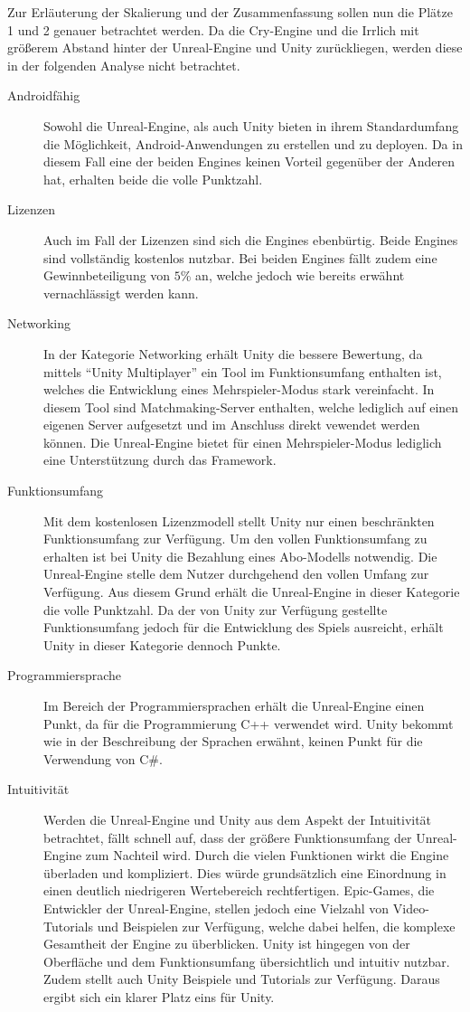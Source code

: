	Zur Erläuterung der Skalierung und der Zusammenfassung sollen nun die Plätze 1 und 2 genauer betrachtet werden.
	Da die Cry-Engine und die Irrlich mit größerem Abstand hinter der Unreal-Engine und Unity zurückliegen, werden diese in der folgenden Analyse nicht betrachtet.
	\begin{description}
		\item[Androidfähig]{Sowohl die Unreal-Engine, als auch Unity bieten in ihrem Standardumfang die Möglichkeit, Android-Anwendungen zu erstellen und zu deployen. Da in diesem Fall eine der beiden Engines keinen Vorteil gegenüber der Anderen hat, erhalten beide die volle Punktzahl.}
		\item[Lizenzen]{Auch im Fall der Lizenzen sind sich die Engines ebenbürtig. Beide Engines sind vollständig kostenlos nutzbar. Bei beiden Engines fällt zudem eine Gewinnbeteiligung von $5$\% an, welche jedoch wie bereits erwähnt vernachlässigt werden kann.}
		\item[Networking]{In der Kategorie Networking erhält Unity die bessere Bewertung, da mittels \enquote{Unity Multiplayer} ein Tool im Funktionsumfang enthalten ist, welches die Entwicklung eines Mehrspieler-Modus stark vereinfacht. In diesem Tool sind Matchmaking-Server enthalten, welche lediglich auf einen eigenen Server aufgesetzt und im Anschluss direkt vewendet werden können. Die Unreal-Engine bietet für einen Mehrspieler-Modus lediglich eine Unterstützung durch das Framework.}
		\item[Funktionsumfang]{Mit dem kostenlosen Lizenzmodell stellt Unity nur einen beschränkten Funktionsumfang zur Verfügung. Um den vollen Funktionsumfang zu erhalten ist bei Unity die Bezahlung eines Abo-Modells notwendig. Die Unreal-Engine stelle dem Nutzer durchgehend den vollen Umfang zur Verfügung. Aus diesem Grund erhält die Unreal-Engine in dieser Kategorie die volle Punktzahl. Da der von Unity zur Verfügung gestellte Funktionsumfang jedoch für die Entwicklung des Spiels ausreicht, erhält Unity in dieser Kategorie dennoch Punkte.}
		\item[Programmiersprache]{Im Bereich der Programmiersprachen erhält die Unreal-Engine einen Punkt, da für die Programmierung C++ verwendet wird. Unity bekommt wie in der Beschreibung der Sprachen erwähnt, keinen Punkt für die Verwendung von C\#.}
		\item[Intuitivität]{Werden die Unreal-Engine und Unity aus dem Aspekt der Intuitivität betrachtet, fällt schnell auf, dass der größere Funktionsumfang der Unreal-Engine zum Nachteil wird. Durch die vielen Funktionen wirkt die Engine überladen und kompliziert. Dies würde grundsätzlich eine Einordnung in einen deutlich niedrigeren Wertebereich rechtfertigen. Epic-Games, die Entwickler der Unreal-Engine, stellen jedoch eine Vielzahl von Video-Tutorials und Beispielen zur Verfügung, welche dabei helfen, die komplexe Gesamtheit der Engine zu überblicken. Unity ist hingegen von der Oberfläche und dem Funktionsumfang übersichtlich und intuitiv nutzbar. Zudem stellt auch Unity Beispiele und Tutorials zur Verfügung. Daraus ergibt sich ein klarer Platz eins für Unity.}

\end{description}
